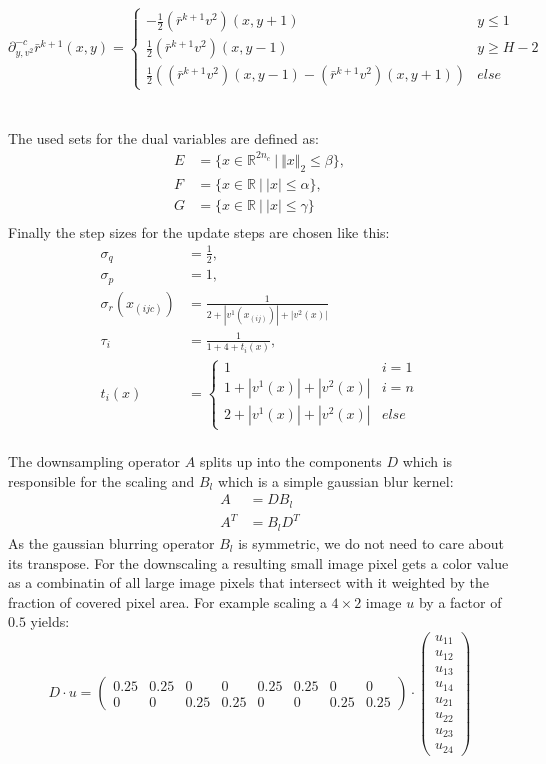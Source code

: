 \documentclass[A4,12pt]{article}
\newcommand{\R}{\mathbb{R}}
\newcommand{\norm}[1]{\Vert #1 \Vert}
\begin{document}
\begin{equation}
\partial^{-c}_{y, v^2} \bar r^{k+1} (x, y) =
\begin{cases}
-\frac{1}{2} (\bar r^{k+1} v^2)(x, y+1) & y \leq 1 \\
\frac{1}{2} (\bar r^{k+1} v^2)(x, y-1) & y \geq H - 2 \\
\frac{1}{2} \left((\bar r^{k+1} v^2)(x, y-1) - (\bar r^{k+1} v^2)(x, y+1)\right) & else
\end{cases}
\end{equation}\\\\
The used sets for the dual variables are defined as:
\begin{align*}
E &= \{x \in \R^{2n_c} ~|~ \norm{x}_2 \leq \beta \}, \\
F &= \{x \in \R ~|~ |x| \leq \alpha \}, \\
G &= \{x \in \R ~|~ |x| \leq \gamma \} \\
\end{align*}
Finally the step sizes for the update steps are chosen like this:
\begin{align*}
\sigma_q &= \frac{1}{2}, \\
\sigma_p &= 1, \\
\sigma_r (x_{(ijc)}) &= \frac{1}{2+|v^1(x_{(ij)})|+|v^2(x)|} \\
\tau_i&=\frac{1}{1+4+t_i(x)}, \\
t_i(x)&=
\begin{cases} 1 & i=1 \\
1+|v^1(x)|+|v^2(x)| & i = n \\
2+|v^1(x)|+|v^2(x)| & else
\end{cases}
\end{align*}\\
The downsampling operator $A$ splits up into the components $D$ which is responsible for the scaling and $B_l$ which is a simple gaussian blur kernel:
\begin{align*}
A&=DB_l \\
A^T&=B_lD^T
\end{align*}
As the gaussian blurring operator $B_l$ is symmetric, we do not need to care about its transpose. For the downscaling a resulting small image pixel gets a color value as a combinatin of all large image pixels that intersect with it weighted by the fraction of covered pixel area. For example scaling a $4 \times 2$ image $u$ by a factor of $0.5$ yields:
$$D \cdot u =
\begin{pmatrix}
0.25 & 0.25 & 0 & 0 & 0.25 & 0.25 & 0 & 0 \\
0 & 0 & 0.25 & 0.25 & 0 & 0 & 0.25 & 0.25
\end{pmatrix}
\cdot
\begin{pmatrix}
u_{11} \\ u_{12} \\ u_{13} \\ u_{14} \\ u_{21} \\ u_{22} \\ u_{23} \\ u_{24}
\end{pmatrix}
$$
\end{document}
